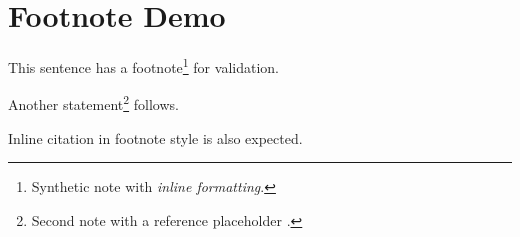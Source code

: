 \documentclass{article}
\begin{document}
\section{Footnote Demo}

This sentence has a footnote\footnote{Synthetic note with \textit{inline formatting}.} for validation.

Another statement\footnote{Second note with a reference placeholder \cite{Demo2026}.} follows.

Inline citation in footnote style\autocite{DemoAutocite2026} is also expected.
\end{document}
